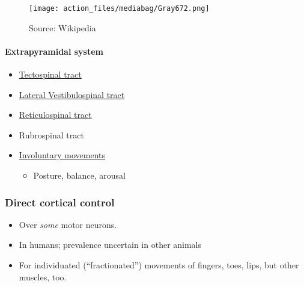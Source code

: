 \documentclass[
  letterpaper,
  DIV=11,
  numbers=noendperiod]{scrartcl}
\let\oldparagraph\paragraph
\renewcommand{\paragraph}[1]{\oldparagraph{#1}\mbox{}}
\providecommand{\tightlist}{%
  \setlength{\itemsep}{0pt}\setlength{\parskip}{0pt}}\usepackage{longtable,booktabs,array}
\begin{document}
\begin{figure}[H]

{\centering \texttt{[image: action\_files/mediabag/Gray672.png]}

}

\caption{Source: Wikipedia}

\end{figure}%

\paragraph{Extrapyramidal system}\label{extrapyramidal-system}

\begin{itemize}
\tightlist
\item
  \href{https://en.wikipedia.org/wiki/Tectospinal_tract}{Tectospinal
  tract}
\item
  \href{https://en.wikipedia.org/wiki/Lateral_vestibulospinal_tract}{Lateral
  Vestibulospinal tract}
\item
  \href{https://en.wikipedia.org/wiki/Reticular_formation\#Descending_reticulospinal_tracts}{Reticulospinal
  tract}
\item
  Rubrospinal tract
\item
  \href{https://en.wikipedia.org/wiki/Extrapyramidal_symptoms}{Involuntary
  movements}

  \begin{itemize}
  \tightlist
  \item
    Posture, balance, arousal
  \end{itemize}
\end{itemize}

\subsubsection{Direct cortical control}\label{direct-cortical-control}

\begin{itemize}
\tightlist
\item
  Over \emph{some} motor neurons.
\item
  In humans; prevalence uncertain in other animals
\item
  For individuated (``fractionated'') movements of fingers, toes, lips,
  but other muscles, too.
\end{itemize}
\end{document}
